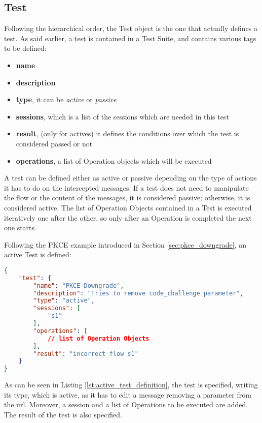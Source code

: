 \subsection{Test}
Following the hierarchical order, the Test object is the one that actually defines a test. As said earlier, a test is contained in a Test Suite, and contains various tags to be defined:
\begin{itemize}
    \item \textbf{name}
    \item \textbf{description}
    \item \textbf{type}, it can be \textit{active} or \textit{passive}
    \item \textbf{sessions}, which is a list of the sessions which are needed in this test
    \item \textbf{result}, (only for actives) it defines the conditions over which the test is considered passed or not
    \item \textbf{operations}, a list of Operation objects which will be executed
\end{itemize}
A test can be defined either as active or passive depending on the type of actions it has to do on the intercepted messages. If a test does not need to manipulate the flow or the content of the messages, it is considered passive; otherwise, it is considered active.
The list of Operation Objects contained in a Test is executed iteratively one after the other, so only after an Operation is completed the next one starts.

Following the \gls{PKCE} example introduced in Section \ref{sec:pkce_downgrade}, an active Test is defined:

\begin{lstlisting}[language=json, caption=Active test definition, label={lst:active_test_definition}]
{
    "test": {
        "name": "PKCE Downgrade",
        "description": "Tries to remove code_challenge parameter",
        "type": "active",
        "sessions": [
            "s1"
        ],
        "operations": [
            // list of Operation Objects
        ],
        "result": "incorrect flow s1"
    }
}    
\end{lstlisting}

As can be seen in Listing \ref{lst:active_test_definition}, the test is specified, writing its type, which is active, as it has to edit a message removing a parameter from the url. Moreover, a session and a list of Operations to be executed are added. The result of the test is also specified.

